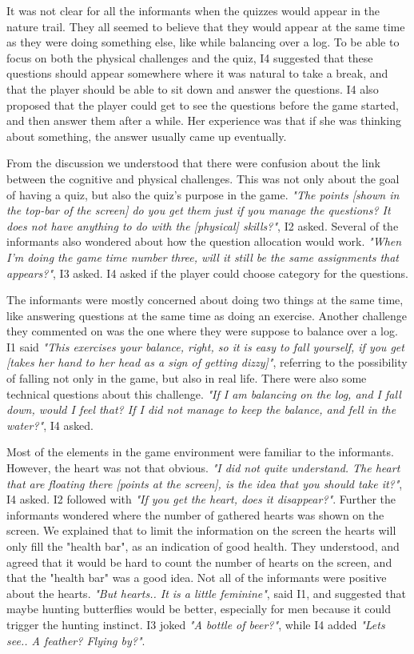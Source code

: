 It was not clear for all the informants when the quizzes would appear in the nature trail. They all seemed to believe that they would appear at the same time as they were doing something else, like while balancing over a log. To be able to focus on both the physical challenges and the quiz, I4 suggested that these questions should appear somewhere where it was natural to take a break, and that the player should be able to sit down and answer the questions. I4 also proposed that the player could get to see the questions before the game started, and then answer them after a while. Her experience was that if she was thinking about something, the answer usually came up eventually. 

From the discussion we understood that there were confusion about the link between the cognitive and physical challenges. This was not only about the goal of having a quiz, but also the quiz's purpose in the game. \emph{"The points [shown in the top-bar of the screen] do you get them just if you manage the questions? It does not have anything to do with the [physical] skills?"}, I2 asked. Several of the informants also wondered about how the question allocation would work. \emph{"When I'm doing the game time number three, will it still be the same assignments that appears?"}, I3 asked. I4 asked if the player could choose category for the questions.  

The informants were mostly concerned about doing two things at the same time, like answering questions at the same time as doing an exercise. Another challenge they commented on was the one where they were suppose to balance over a log. I1 said \emph{"This exercises your balance, right, so it is easy to fall yourself, if you get [takes her hand to her head as a sign of getting dizzy]"}, referring to the possibility of falling not only in the game, but also in real life. There were also some technical questions about this challenge. \emph{"If I am balancing on the log, and I fall down, would I feel that? If I did not manage to keep the balance, and fell in the water?"}, I4 asked. 

Most of the elements in the game environment were familiar to the informants. However, the heart was not that obvious. \emph{"I did not quite understand. The heart that are floating there [points at the screen], is the idea that you should take it?"}, I4 asked. I2 followed with \emph{"If you get the heart, does it disappear?"}. Further the informants wondered where the number of gathered hearts was shown on the screen. We explained that to limit the information on the screen the hearts will only fill the "health bar", as an indication of good health. They understood, and agreed that it would be hard to count the number of hearts on the screen, and that the "health bar" was a good idea. Not all of the informants were positive about the hearts. \emph{"But hearts.. It is a little feminine"}, said I1, and suggested that maybe hunting butterflies would be better, especially for men because it could trigger the hunting instinct. I3 joked \emph{"A bottle of beer?"}, while I4 added \emph{"Lets see.. A feather? Flying by?"}. 


